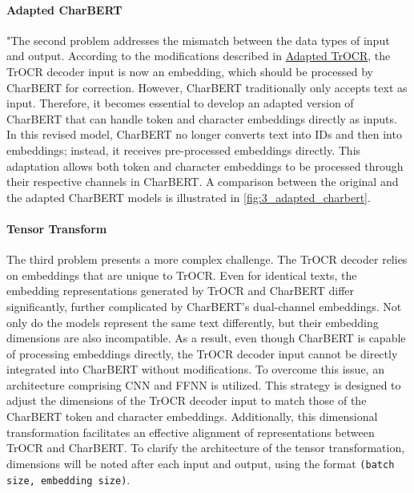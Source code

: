 \paragraph*{Adapted CharBERT}
\label{par:3_adapted_charbert}
"The second problem addresses the mismatch between the data types of input and output. According to the modifications described in \hyperref[par:3_adapted_trocr]{Adapted TrOCR}, the TrOCR decoder input is now an embedding, which should be processed by CharBERT for correction. However, CharBERT traditionally only accepts text as input. Therefore, it becomes essential to develop an adapted version of CharBERT that can handle token and character embeddings directly as inputs. In this revised model, CharBERT no longer converts text into IDs and then into embeddings; instead, it receives pre-processed embeddings directly. This adaptation allows both token and character embeddings to be processed through their respective channels in CharBERT. A comparison between the original and the adapted CharBERT models is illustrated in \autoref{fig:3_adapted_charbert}.


\paragraph*{Tensor Transform}
\label{par:3_tensor_transform}
The third problem presents a more complex challenge. The TrOCR decoder relies on embeddings that are unique to TrOCR. Even for identical texts, the embedding representations generated by TrOCR and CharBERT differ significantly, further complicated by CharBERT's dual-channel embeddings. Not only do the models represent the same text differently, but their embedding dimensions are also incompatible. As a result, even though CharBERT is capable of processing embeddings directly, the TrOCR decoder input cannot be directly integrated into CharBERT without modifications. To overcome this issue, an architecture comprising CNN and FFNN is utilized. This strategy is designed to adjust the dimensions of the TrOCR decoder input to match those of the CharBERT token and character embeddings. Additionally, this dimensional transformation facilitates an effective alignment of representations between TrOCR and CharBERT. To clarify the architecture of the tensor transformation, dimensions will be noted after each input and output, using the format \texttt{(batch size, embedding size)}.

